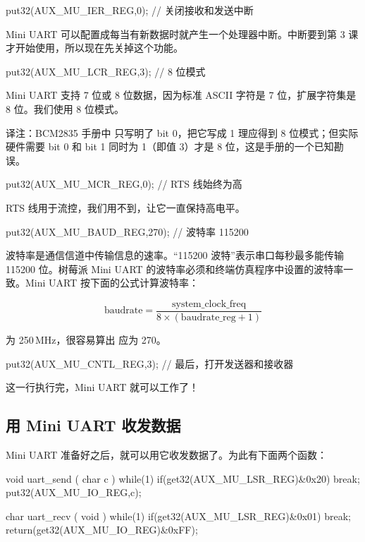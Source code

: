 \begin{ccode}
	put32(AUX_MU_IER_REG,0);    // 关闭接收和发送中断
\end{ccode}

Mini UART 可以配置成每当有新数据时就产生一个处理器中断。中断要到第 3 课才开始使用，所以现在先关掉这个功能。

\begin{ccode}
	put32(AUX_MU_LCR_REG,3);    // 8 位模式
\end{ccode}

Mini UART 支持 7 位或 8 位数据，因为标准 ASCII 字符是 7 位，扩展字符集是 8 位。我们使用 8 位模式。

\begin{remark}
  译注：BCM2835 手册中  只写明了 bit 0，把它写成 1 理应得到 8 位模式；但实际硬件需要 bit 0 和 bit 1 同时为 1（即值 3）才是 8 位，这是手册的一个已知勘误。
\end{remark}

\begin{ccode}
	put32(AUX_MU_MCR_REG,0);    // RTS 线始终为高
\end{ccode}

RTS 线用于流控，我们用不到，让它一直保持高电平。

\begin{ccode}
	put32(AUX_MU_BAUD_REG,270); // 波特率 115200
\end{ccode}

波特率是通信信道中传输信息的速率。“115200 波特”表示串口每秒最多能传输 115200 位。树莓派 Mini UART 的波特率必须和终端仿真程序中设置的波特率一致。Mini UART 按下面的公式计算波特率：

\[
  \text{baudrate} = \frac{\text{system\_clock\_freq}}{8 \times (\text{baudrate\_reg} + 1)}
\]

 为 250\,MHz，很容易算出  应为 270。

\begin{ccode}
	put32(AUX_MU_CNTL_REG,3);   // 最后，打开发送器和接收器
\end{ccode}

这一行执行完，Mini UART 就可以工作了！

\subsection{用 Mini UART 收发数据}

Mini UART 准备好之后，就可以用它收发数据了。为此有下面两个函数：

\begin{ccode}
void uart_send ( char c )
{
	while(1) {
		if(get32(AUX_MU_LSR_REG)&0x20)
			break;
	}
	put32(AUX_MU_IO_REG,c);
}

char uart_recv ( void )
{
	while(1) {
		if(get32(AUX_MU_LSR_REG)&0x01)
			break;
	}
	return(get32(AUX_MU_IO_REG)&0xFF);
}
\end{ccode}

